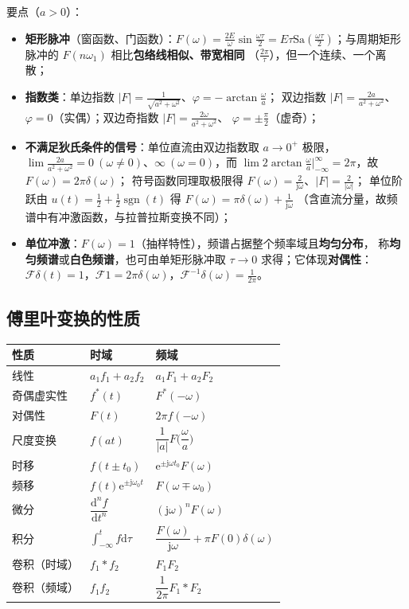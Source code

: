 要点（$a>0$）：
\begin{itemize}
\item \textbf{矩形脉冲}（窗函数、门函数）：$F(\omega)=\frac{2E}{\omega}\sin\frac{\omega\tau}{2}
  =E\tau\mathrm{Sa}(\frac{\omega\tau}{2})$；与周期矩形脉冲的 $F(n\omega_1)$ 相比\textbf{包络线相似、带宽相同}
  （$\frac{2\pi}{\tau}$），但一个连续、一个离散；
\item \textbf{指数类}：单边指数 $|F|=\frac{1}{\sqrt{a^2+\omega^2}}$、$\varphi=-\arctan\frac{\omega}{a}$；
  双边指数 $|F|=\frac{2a}{a^2+\omega^2}$、$\varphi=0$（实偶）；双边奇指数 $|F|=\frac{2\omega}{a^2+\omega^2}$、
  $\varphi=\pm\frac{\pi}{2}$（虚奇）；
\item \textbf{不满足狄氏条件的信号}：单位直流由双边指数取 $a\to0^+$ 极限，
  $\lim\frac{2a}{a^2+\omega^2}=0\ (\omega\neq0)$、$\infty\ (\omega=0)$，而
  $\lim 2\arctan\frac{\omega}{a}\big|_{-\infty}^{\infty}=2\pi$，故 $F(\omega)=2\pi\delta(\omega)$；
  符号函数同理取极限得 $F(\omega)=\frac{2}{\mathrm{j}\omega}$、$|F|=\frac{2}{|\omega|}$；
  单位阶跃由 $u(t)=\frac12+\frac12\operatorname{sgn}(t)$ 得 $F(\omega)=\pi\delta(\omega)+\frac{1}{\mathrm{j}\omega}$
  （含直流分量，故频谱中有冲激函数，与拉普拉斯变换不同）；
\item \textbf{单位冲激}：$F(\omega)=1$（抽样特性），频谱占据整个频率域且\textbf{均匀分布}，
  称\textbf{均匀频谱}或\textbf{白色频谱}，也可由单矩形脉冲取 $\tau\to0$ 求得；它体现\textbf{对偶性}：
  $\mathcal{F}\delta(t)=1$，$\mathcal{F}1=2\pi\delta(\omega)$，$\mathcal{F}^{-1}\delta(\omega)=\frac{1}{2\pi}$。
\end{itemize}

\subsection{傅里叶变换的性质}

\begin{center}
\begin{tabular}{lll}
\toprule
性质 & 时域 & 频域 \\
\midrule
线性 & $a_1f_1+a_2f_2$ & $a_1F_1+a_2F_2$ \\
奇偶虚实性 & $f^{*}(t)$ & $F^{*}(-\omega)$ \\
对偶性 & $F(t)$ & $2\pi f(-\omega)$ \\
尺度变换 & $f(at)$ & $\dfrac{1}{|a|}F\big(\dfrac{\omega}{a}\big)$ \\
时移 & $f(t\pm t_0)$ & $\mathrm{e}^{\pm\mathrm{j}\omega t_0}F(\omega)$ \\
频移 & $f(t)\mathrm{e}^{\pm\mathrm{j}\omega_0t}$ & $F(\omega\mp\omega_0)$ \\
微分 & $\dfrac{\mathrm{d}^nf}{\mathrm{d}t^n}$ & $(\mathrm{j}\omega)^nF(\omega)$ \\
积分 & $\displaystyle\int_{-\infty}^{t}f\mathrm{d}\tau$ & $\dfrac{F(\omega)}{\mathrm{j}\omega}+\pi F(0)\delta(\omega)$ \\
卷积（时域） & $f_1*f_2$ & $F_1F_2$ \\
卷积（频域） & $f_1f_2$ & $\dfrac{1}{2\pi}F_1*F_2$ \\
\bottomrule
\end{tabular}
\end{center}

